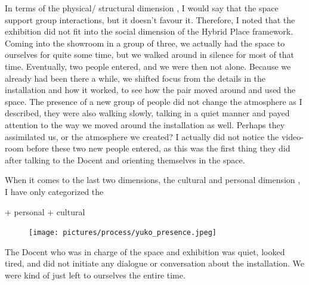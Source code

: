 In terms of the physical/ structural dimension \autocite{hybridplace_ciolfi}, I would say that the space support group interactions, but it doesn't favour it. Therefore, I noted that the exhibition did not fit into the social dimension of the Hybrid Place framework. Coming into the showroom in a group of three, we actually had the space to ourselves for quite some time, but we walked around in silence for most of that time. Eventually, two people entered, and we were then not alone. Because we already had been there a while, we shifted focus from the details in the installation and how it worked, to see how the pair moved around and used the space. The presence of a new group of people did not change the atmosphere as I described, they were also walking slowly, talking in a quiet manner and payed attention to the way we moved around the installation as well. Perhaps they assimilated us, or the atmosphere we created? I actually did not notice the video-room before these two new people entered, as this was the first thing they did after talking to the Docent and orienting themselves in the space.

When it comes to the last two dimensions, the cultural and personal dimension \autocite{hybridplace_ciolfi}, I have only categorized the 

+ personal
+ cultural


\begin{figure}[H]
\texttt{[image: pictures/process/yuko\_presence.jpeg]}
\centering 
\end{figure}

The Docent who was in charge of the space and exhibition was quiet, looked tired, and did not initiate any dialogue or conversation about the installation. We were kind of just left to ourselves the entire time.

